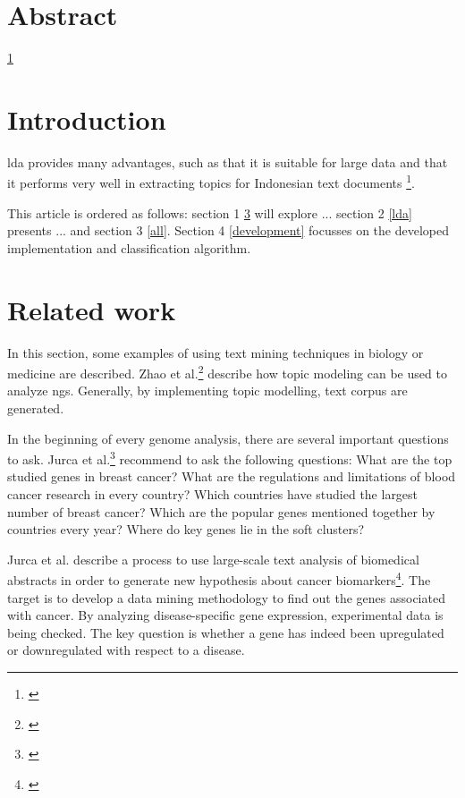 





\chapter{Abstract}\label{abstract}
\ref{abstract}

\chapter{Introduction}\label{introduction}

\gls{lda} provides many advantages, such as that it is suitable for large data and that it performs very well in extracting topics for Indonesian text documents \footnote{\autocite{twinandilla_2018}}.

This article is ordered as follows: section 1 \ref{related} will explore ...
section 2 \ref{lda} presents ... and section 3 \ref{all}. Section 4 \ref{development} focusses on the developed implementation and classification algorithm.

\chapter{Related work}\label{related}

In this section, some examples of using text mining techniques in biology or medicine are described.
Zhao et al.\footnote{\autocite{zhao_2016}} describe how topic modeling can be used to analyze \gls{ngs}. Generally, by implementing topic modelling, text corpus are generated.

In the beginning of every genome analysis, there are several important questions to ask. Jurca et al.\footnote{\autocite{jurca_2016}} recommend to ask the following questions: What are the top studied genes in breast cancer? What are the regulations and limitations of blood cancer research in every country? Which countries have studied the largest number of breast cancer? Which are the popular genes mentioned together by countries every year? Where do key genes lie in the soft clusters?

Jurca et al. describe a process to use large-scale text analysis of biomedical abstracts in order to generate new hypothesis about cancer biomarkers\footnote{\autocite{jurca_2016}}. The target is to develop a data mining methodology to find out the genes associated with cancer. By analyzing disease-specific gene expression, experimental data is being checked. The key question is whether a gene has indeed been upregulated or downregulated with respect to a disease.

